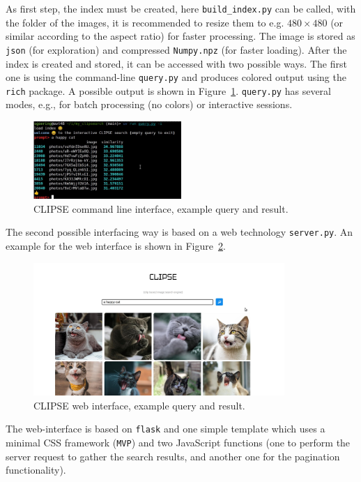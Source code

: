 \documentclass{article}
\begin{document}
As first step, the index must be created, here \lstinline[language={bash}]{build_index.py} can be called, with the folder of the images, it is recommended to resize them to e.g. $480\times480$ (or similar according to the aspect ratio) for faster processing.
The image is stored as \texttt{json} (for exploration) and compressed \texttt{Numpy.npz} (for faster loading).
After the index is created and stored, it can be accessed with two possible ways.
The first one is using the command-line \lstinline[language={bash}]{query.py} and produces colored output using the \texttt{rich} package.
A possible output is shown in Figure~\ref{fig:cli}.
\lstinline[language={bash}]{query.py} has several modes, e.g., for batch processing (no colors) or interactive sessions.

\begin{figure}
\centering
\includegraphics[width=0.5\textwidth]{CLI.jpg}
\caption{CLIPSE command line interface, example query and result.}
\label{fig:cli}
\end{figure}

The second possible interfacing way is based on a web technology \lstinline[language={bash}]{server.py}.
An example for the web interface is shown in Figure~\ref{fig:web}.

\begin{figure}
\centering
\includegraphics[width=0.85\textwidth]{WEB.jpg}
\caption{CLIPSE web interface, example query and result.}
\label{fig:web}
\end{figure}

The web-interface is based on \texttt{flask} and one simple template which uses a minimal CSS framework (\texttt{MVP}) and two JavaScript functions (one to perform the server request to gather the search results, and another one for the pagination functionality).
\end{document}
